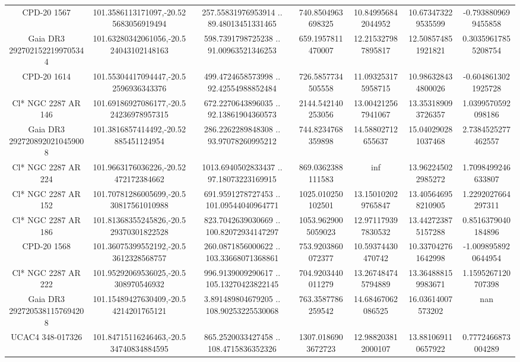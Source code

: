 \begin{table}
\begin{tabular}{ccccccc}
CPD-20  1567 & 101.3586113171097,-20.525683056919494 & 257.55831976953914 .. 89.48013451331465 & 740.8504963698325 & 10.849956842044952 & 10.673473229535599 & -0.7938809699455858 \\
Gaia DR3 2927021522199705344 & 101.63280342061056,-20.524043102148163 & 598.7391798725238 .. 91.00963521346253 & 659.1957811470007 & 12.215327987895817 & 12.508574851921821 & 0.30359617855208754 \\
CPD-20  1614 & 101.55304417094447,-20.52596936343376 & 499.4724658573998 .. 92.42554988852484 & 726.5857734505558 & 11.093253175958715 & 10.986328434800026 & -0.6048613021925728 \\
Cl* NGC 2287     AR     146 & 101.69186927086177,-20.524236978957315 & 672.2270643896035 .. 92.13861904360573 & 2144.542140253056 & 13.004212567941067 & 13.353189093726357 & 1.0399570592098186 \\
Gaia DR3 2927208920210459008 & 101.3816857414492,-20.52885451124954 & 286.2262289848308 .. 93.97078260995212 & 744.8234768359898 & 14.58802712655637 & 15.040290281037468 & 2.7384525277462557 \\
Cl* NGC 2287     AR     224 & 101.9663176036226,-20.52472172384662 & 1013.6940502833437 .. 97.18073223169915 & 869.0362388111583 & inf & 13.962245022985272 & 1.7098499246633807 \\
Cl* NGC 2287     AR     152 & 101.70781286005699,-20.530817561010988 & 691.9591278727453 .. 101.09544040964771 & 1025.010250102501 & 13.150102029765847 & 13.405646958210905 & 1.2292027664297311 \\
Cl* NGC 2287     AR     186 & 101.81368355245826,-20.529370301822528 & 823.7042639030669 .. 100.82072934147297 & 1053.9629005059023 & 12.971179397830532 & 13.442723875157288 & 0.8516379040184896 \\
CPD-20  1568 & 101.36075399552192,-20.53612328568757 & 260.0871856000622 .. 103.33668071368861 & 753.9203860072377 & 10.59374430470742 & 10.337042761642998 & -1.0098958920644954 \\
Cl* NGC 2287     AR     222 & 101.95292069536025,-20.5308970546932 & 996.9139009290617 .. 105.13270423822145 & 704.9203440011279 & 13.267484745794889 & 13.364888159983671 & 1.1595267120707398 \\
Gaia DR3 2927205381157694208 & 101.15489427630409,-20.54214201765121 & 3.891489804679205 .. 108.90253225530068 & 763.3587786259542 & 14.68467062086525 & 16.03614007573202 & nan \\
UCAC4 348-017326 & 101.84715116246463,-20.534740834884595 & 865.2520033427458 .. 108.4715836352326 & 1307.0186903672723 & 12.988203812000107 & 13.881069110657922 & 0.7772466873004289 \\

\end{tabular}
\end{table}
